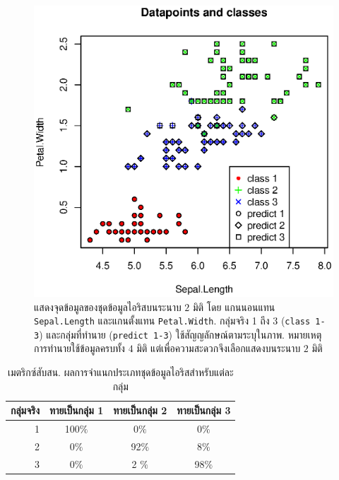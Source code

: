 % 
\begin{figure}
\begin{center}
\includegraphics[width=5.5in]{03Linear/irisMulticlass.eps}
\end{center}
\caption{แสดงจุดข้อมูลของชุดข้อมูลไอริสบนระนาบ $2$ มิติ
โดย แกนนอนแทน \texttt{Sepal.Length} 
และแกนตั้งแทน \texttt{Petal.Width}.
กลุ่มจริง 1 ถึง 3 (\texttt{class 1-3}) และกลุ่มที่ทำนาย (\texttt{predict 1-3}) 
ใช้สัญญลักษณ์ตามระบุในภาพ.
หมายเหตุ การทำนายใช้ข้อมูลครบทั้ง $4$ มิติ แต่เพื่อความสะดวกจึงเลือกแสดงบนระนาบ $2$ มิติ}
\label{fig: linear classification iris classified datapoints}
\end{figure}
%
\begin{table}[hbtp]
\caption{เมตริกซ์สับสน. ผลการจำแนกประเภทชุดข้อมูลไอริสสำหรับแต่ละกลุ่ม}
\begin{center}
\begin{tabular}{|r|c|c|c|}
\hline 
กลุ่มจริง & ทายเป็นกลุ่ม 1 & ทายเป็นกลุ่ม 2 & ทายเป็นกลุ่ม 3 \\
\hline
1 & 100$\%$ & 0$\%$ & 0$\%$ \\
\hline
2 & 0$\%$ & 92$\%$ & 8$\%$ \\
\hline
3 & 0$\%$ & 2 $\%$ & 98$\%$ \\ 
\hline
\end{tabular} 
\end{center}
\label{tbl: linear iris classification results}
\end{table}

